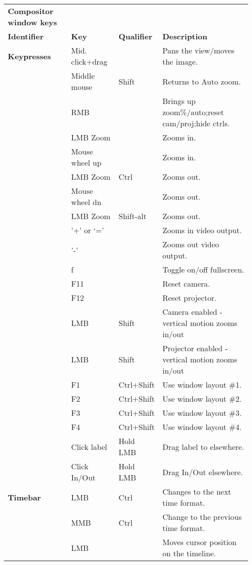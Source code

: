 \begin{longtable}[h]{>{\bfseries}p{}p{}p{}p{}}
  \toprule
  \multicolumn{4}{c}%
  {\textcolor{CinRed}{\textbf{Compositor window keys}}} \\
  Identifier & \textbf{Key} & \textbf{Qualifier} & \textbf{Description}\\
  \midrule
  \endhead
  \textcolor{CinBlueText}{Keypresses} & Mid. click+drag &  & Pans the view/moves the image. \\
  & Middle mouse & Shift & Returns to Auto zoom. \\
  & RMB &  & Brings up zoom\%/auto;reset cam/proj;hide ctrls. \\
  & LMB Zoom &  & Zooms in. \\
  & Mouse wheel up &  & Zooms in. \\
  & LMB Zoom & Ctrl & Zooms out. \\
  & Mouse wheel dn &  & Zooms out. \\
  & LMB Zoom & Shift-alt & Zooms out. \\
  & '+' or ‘=’ &  & Zooms in video output. \\
  & '-' &  & Zooms out video output. \\
  & f &  & Toggle on/off fullscreen. \\
  & F11 &  & Reset camera. \\
  & F12 &  & Reset projector. \\
  & LMB & Shift & Camera enabled - vertical motion zooms in/out\\
  & LMB & Shift & Projector enabled - vertical motion zooms in/out\\
  & F1 & Ctrl+Shift & Use window layout \#1. \\
  & F2 & Ctrl+Shift & Use window layout \#2. \\
  & F3 & Ctrl+Shift & Use window layout \#3. \\
  & F4 & Ctrl+Shift & Use window layout \#4. \\
  & Click label & Hold LMB & Drag label to elsewhere. \\
  & Click In/Out & Hold LMB & Drag In/Out elsewhere. \\
  \midrule
  \textcolor{CinBlueText}{Timebar} & LMB & Ctrl & Changes to the next time format. \\
  & MMB & Ctrl & Change to the previous time format. \\
  & LMB &  & Moves cursor position on the timeline. \\

\end{longtable}
